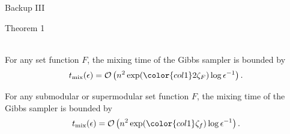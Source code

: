 \documentclass[mathserif]{beamer}
\newcommand{\qtheorem}[2]{%
\begin{tcolorbox}[enhanced jigsaw,size=tight,boxsep=7pt,boxrule=0.7pt,coltext=textcolor,colframe=col2,colback=col1,opacityback=0,opacityframe=1]
\begin{minipage}{\textwidth}
{\color{col2}\strut Theorem #1}\\[0.7em]
#2
\end{minipage}
\end{tcolorbox}%
}
\begin{document}
\begin{frame}{Backup III}
\qtheorem{1}{
For any set function $F$, the mixing time of the Gibbs sampler is bounded by
\begin{align*}
t_{\textrm{mix}}(\epsilon) = \mathcal{O}\left(n^2 \exp({\color{col1}2\zeta_F})\log\epsilon^{-1}\right).
\end{align*}

\vspace{1em}
For any {\color{col1}submodular or supermodular} set function $F$, the mixing time of the Gibbs sampler is bounded by
\begin{align*}
t_{\textrm{mix}}(\epsilon) = \mathcal{O}\left(n^2 \exp({\color{col1}\zeta_f})\log\epsilon^{-1}\right).
\end{align*}
}
\end{frame}
\end{document}
